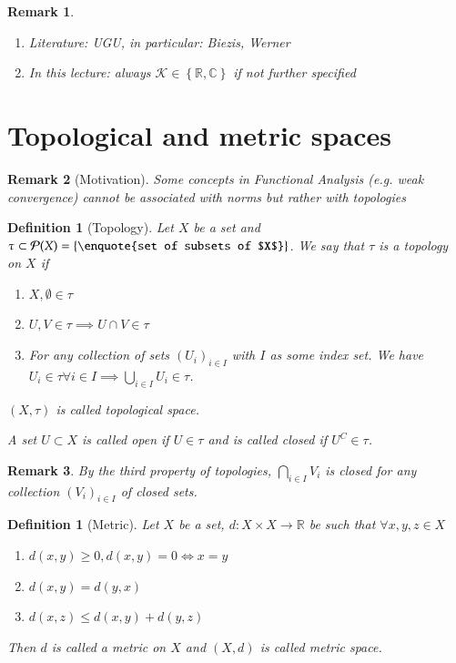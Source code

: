 \documentclass{article}
\newcounter{lecref}[section]
\numberwithin{lecref}{section}
\newtheorem{definition}[lecref]{Definition}
\newtheorem*{Remark}{Remark}
\newcommand{\Set}[1]{\left\{#1\right\}}
\begin{document}
\begin{Remark}
	\begin{enumerate}
		\item Literature: UGU, in particular: Biezis, Werner
		\item In this lecture: always $\mathcal K \in \Set{\mathbb R, \mathbb C}$ if not further specified
	\end{enumerate}
\end{Remark}

\section{Topological and metric spaces}

\begin{Remark}[Motivation]
	Some concepts in Functional Analysis (e.g. weak convergence) cannot be associated with norms but rather with topologies
\end{Remark}

\begin{definition}[Topology]
	\label{definition:1.1}
	Let $X$ be a set and $\tau \subset \mathcal P(X) = \Set{\text{\enquote{set of subsets of $X$}}}$.
	We say that $\tau$ is a \emph{topology} on $X$ if
	\begin{enumerate}
		\item $X, \emptyset \in \tau$
		\item $U, V \in \tau \implies U \cap V \in \tau$
		\item For any collection of sets $(U_i)_{i \in I}$ with $I$ as some index set. We have $U_i \in \tau \forall i \in I \implies \bigcup_{i \in I} U_i \in \tau$.
	\end{enumerate}
	$(X, \tau)$ is called \emph{topological space}.

	A set $U \subset X$ is called \emph{open} if $U \in \tau$ and is called closed if $U^C \in \tau$.
\end{definition}

\begin{Remark}
	By the third property of topologies, $\bigcap_{i \in I} V_i$ is closed for any collection $(V_i)_{i \in I}$ of closed sets.
\end{Remark}

\begin{definition}[Metric]
	\label{definition:1.2}
	Let $X$ be a set, $d: X \times X \to \mathbb R$ be such that $\forall x, y, z \in X$
	\begin{enumerate}
		\item $d(x, y) \geq 0, d(x, y) = 0 \iff x = y$
		\item $d(x, y) = d(y, x)$
		\item $d(x, z) \leq d(x, y) + d(y, z)$
	\end{enumerate}
	Then $d$ is called a \emph{metric on $X$} and $(X, d)$ is called \emph{metric space}.
\end{definition}
\end{document}
